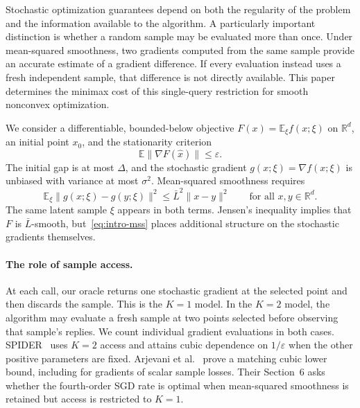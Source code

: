 \documentclass[11pt]{article}
\newcommand{\R}{\mathbb R}
\newcommand{\E}{\mathbb E}
\newcommand{\eps}{\varepsilon}
\theoremstyle{definition}
\theoremstyle{remark}
\begin{document}
Stochastic optimization guarantees depend on both the regularity of the
problem and the information available to the algorithm. A particularly
important distinction is whether a random sample may be evaluated more than
once. Under mean-squared smoothness, two gradients computed from the same
sample provide an accurate estimate of a gradient difference. If every
evaluation instead uses a fresh independent sample, that difference is not
directly available. This paper determines the minimax cost of this
single-query restriction for smooth nonconvex optimization.

We consider a differentiable, bounded-below objective
$F(x)=\E_\xi f(x;\xi)$ on $\R^d$, an initial point $x_0$, and the stationarity
criterion
\begin{equation}\label{eq:intro-target}
 \E\|\nabla F(\widehat x)\|\le\eps.
\end{equation}
The initial gap is at most $\Delta$, and the stochastic gradient
$g(x;\xi)=\nabla f(x;\xi)$ is unbiased with variance at most $\sigma^2$.
Mean-squared smoothness requires
\begin{equation}\label{eq:intro-mss}
 \E_\xi\|g(x;\xi)-g(y;\xi)\|^2
 \le \bar L^2\|x-y\|^2
 \qquad\text{for all }x,y\in\R^d.
\end{equation}
The same latent sample $\xi$ appears in both terms. Jensen's inequality
implies that $F$ is $\bar L$-smooth, but~\eqref{eq:intro-mss} places additional
structure on the stochastic gradients themselves.

\paragraph{The role of sample access.}
At each call, our oracle returns one stochastic gradient at the selected
point and then discards the sample. This is the $K=1$ model. In the $K=2$
model, the algorithm may evaluate a fresh sample at two points selected
before observing that sample's replies. We count individual gradient
evaluations in both cases. SPIDER~\cite{spider} uses $K=2$ access and attains
cubic dependence on $1/\eps$ when the other positive parameters are fixed.
Arjevani et al.~\cite[Theorem~3 and Proposition~1]{arjevani} prove a matching
cubic lower bound, including for gradients of scalar sample losses.
Their Section~6 asks whether the fourth-order SGD rate is optimal when
mean-squared smoothness is retained but access is restricted to $K=1$.
\end{document}
